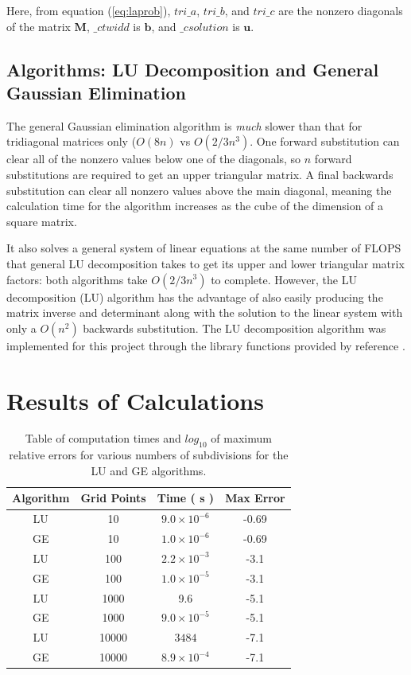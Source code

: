 \documentclass[a4paper,12pt]{report}
\begin{document}
Here, from equation (\ref{eq:laprob}), $tri\_a$, $tri\_b$, and $tri\_c$ are the nonzero diagonals of the matrix $\boldsymbol{M}$, $\_ctwidd$ is $\boldsymbol{b}$, and $\_csolution$ is $\boldsymbol{u}$.

\subsection{Algorithms: LU Decomposition and General Gaussian Elimination}

The general Gaussian elimination algorithm is \textit{much} slower than that for tridiagonal matrices only ($O(8n)$ vs $O(2/3n^3)$. One forward substitution can clear all of the nonzero values below one of the diagonals, so $n$ forward substitutions are required to get an upper triangular matrix. A final backwards substitution can clear all nonzero values above the main diagonal, meaning the calculation time for the algorithm increases as the cube of the dimension of a square matrix. 

It also solves a general system of linear equations at the same number of FLOPS that general LU decomposition takes to get its upper and lower triangular matrix factors: both algorithms take $O(2/3n^3)$ to complete. However, the LU decomposition (LU) algorithm has the advantage of also easily producing the matrix inverse and determinant along with the solution to the linear system with only a $O(n^2)$ backwards substitution. The LU decomposition algorithm was implemented for this project through the library functions provided by reference \cite{Dux:2016}.

\section{Results of Calculations}

\begin{table}[h]
 \centering
\begin{center}
\begin{tabular}{|c|c|c|c|}\hline
\textbf{Algorithm} & \textbf{Grid Points} & \textbf{Time ( s )} & \textbf{Max Error}\\\hline
LU & 10 & $9.0\times 10^{-6}$ & -0.69\\\hline
GE & 10 & $1.0\times 10^{-6}$ & -0.69\\\hline
LU & 100 & $2.2\times 10^{-3}$ & -3.1\\\hline
GE & 100 & $1.0\times 10^{-5}$ & -3.1\\\hline
LU & 1000 & 9.6 & -5.1\\\hline
GE & 1000 & $9.0\times 10^{-5}$ & -5.1\\\hline
LU & 10000 & $3484$ & -7.1 \\\hline
GE & 10000 & $8.9\times 10^{-4}$ & -7.1\\\hline
\end{tabular}
\end{center}
\caption{Table of computation times and $log_{10}$ of maximum relative errors for various numbers of subdivisions for the LU and GE algorithms.\label{tbl:AlgStat}}
\end{table}
\end{document}
